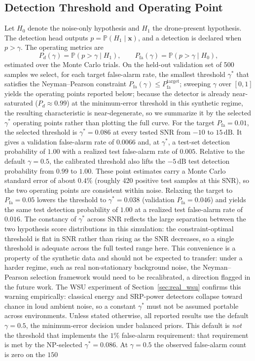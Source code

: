 \documentclass[sensors,article,submit,pdftex,moreauthors]{Definitions/mdpi}
\begin{document}
\subsection{Detection Threshold and Operating Point}
\label{sec:np}
Let $H_0$ denote the noise-only hypothesis and $H_1$ the drone-present hypothesis. The detection head outputs $p=\mathbb{P}(H_1\mid\boldsymbol{x})$, and a detection is declared when $p>\gamma$. The operating metrics are
\begin{equation}
    P_d(\gamma)=\mathbb{P}(p>\gamma\mid H_1), \qquad P_{\mathrm{fa}}(\gamma)=\mathbb{P}(p>\gamma\mid H_0),
    \label{eq:pdpfa}
\end{equation}
estimated over the Monte Carlo trials. On the held-out validation set of 500 samples we select, for each target false-alarm rate, the smallest threshold $\gamma^*$ that satisfies the Neyman--Pearson constraint $P_{\mathrm{fa}}(\gamma)\le P_{\mathrm{fa}}^{\mathrm{target}}$; sweeping $\gamma$ over $[0,1]$ yields the operating points reported below; because the detector is already near-saturated ($P_d\approx0.99$) at the minimum-error threshold in this synthetic regime, the resulting characteristic is near-degenerate, so we summarize it by the selected $\gamma^*$ operating points rather than plotting the full curve. For the target $P_{\mathrm{fa}}=0.01$, the selected threshold is $\gamma^*=0.086$ at every tested SNR from $-10$ to $15\,\mathrm{dB}$. It gives a validation false-alarm rate of $0.0066$ and, at $\gamma^*$, a test-set detection probability of $1.00$ with a realized test false-alarm rate of $0.005$. Relative to the default $\gamma=0.5$, the calibrated threshold also lifts the $-5\,\mathrm{dB}$ test detection probability from $0.99$ to $1.00$. These point estimates carry a Monte Carlo standard error of about $0.4\%$ (roughly 420 positive test samples at this SNR), so the two operating points are consistent within noise. Relaxing the target to $P_{\mathrm{fa}}=0.05$ lowers the threshold to $\gamma^*=0.038$ (validation $P_{\mathrm{fa}}=0.046$) and yields the same test detection probability of $1.00$ at a realized test false-alarm rate of $0.016$. The constancy of $\gamma^*$ across SNR reflects the large separation between the two hypothesis score distributions in this simulation: the constraint-optimal threshold is flat in SNR rather than rising as the SNR decreases, so a single threshold is adequate across the full tested range here. This convenience is a property of the synthetic data and should not be expected to transfer: under a harder regime, such as real non-stationary background noise, the Neyman--Pearson selection framework would need to be recalibrated, a direction flagged in the future work. The WSU experiment of Section~\ref{sec:real_wsu} confirms this warning empirically: classical energy and SRP-power detectors collapse toward chance in loud ambient noise, so a constant $\gamma^*$ must not be assumed portable across environments. Unless stated otherwise, all reported results use the default $\gamma=0.5$, the minimum-error decision under balanced priors. This default is \emph{not} the threshold that implements the $1\%$ false-alarm requirement: that requirement is met by the NP-selected $\gamma^*=0.086$. At $\gamma=0.5$ the observed false-alarm count is zero on the $150$ 
\end{document}
